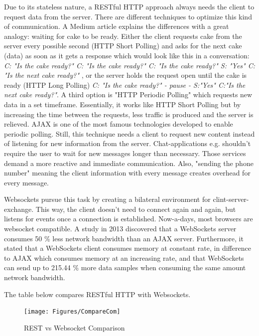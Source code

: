 Due to its stateless nature, a RESTful HTTP approach always needs the client to request data from the server.
There are different techniques to optimize this kind of communication. A Medium article
\parencite{comSummary} explains the differences with a great analogy: waiting for cake to be ready.
Either the client requests cake from the server every possible second (HTTP Short Polling) and asks for the next cake (data) as soon as it gets a response which would look like this in a conversation: 
\textit{ C: "Is the cake ready?" 
C: "Is the cake ready?"
 C: "Is the cake ready?" 
 S: "Yes" 
 C: "Is the next cake ready?"} ,
or the server holds the request open until the cake is ready (HTTP Long Polling) \textit{C: "Is the cake ready?" - pause -  S:"Yes" C:"Is the next cake ready?"}.
A third option is "HTTP Periodic Polling" which requests new data in a set timeframe. 
Essentially, it works like HTTP Short Polling but by increasing the time between the requests, less traffic is produced and the server is relieved.
AJAX \parencite{ajax} is one of the most famous technologies developed to enable periodic polling.
Still, this technique needs a client to request new content instead of listening 
for new information from the server. 
Chat-applications e.g. shouldn't require the user to wait for new messages longer than necessary.
Those services demand a more reactive and immediate communication.
Also, "sending the phone number" meaning the client information with every message creates overhead for every message.

Websockets pursue this task by creating a bilateral environment for clint-server-exchange. 
This way, the client doesn't need to connect again and again, but listens for events once a connection is established.
Now-a-days, most browsers are websocket compatible.
A study in 2013  \parencite{comAJAXvsWeb} discovered that a WebSockets server consumes 50 \% 
less network bandwidth than an AJAX server.
Furthermore, it stated that a WebSockets client consumes memory at constant rate, 
in difference to AJAX which consumes memory at an increasing rate, and that WebSockets can send up to 215.44 \% 
more data samples when consuming the same amount network bandwidth.

The table below compares RESTful HTTP with Websockets. 

\begin{figure}[b]
	\centering
    \texttt{[image: Figures/CompareCom]}
	\decoRule
	\caption[Communication Comparison]{REST vs Websocket Comparison}
	\label{fig:CompareCom}
\end{figure}

